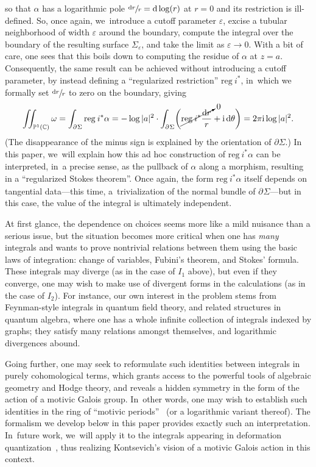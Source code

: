 \documentclass[10pt]{amsart}
\newcommand{\rbbrac}[1]{\biggl(#1\biggr)}
\newcommand{\dslog}[1]{\sfrac{\dd#1}{#1}}
\theoremstyle{definition}
\theoremstyle{remark}
\newcommand{\CC}{\mathbb{C}}
\newcommand{\PP}{\mathbb{P}}
\newcommand{\iu}{\mathrm{i}}
\let\epsilon\varepsilon
\newcommand{\dd}{\mathrm{d}}
\newcommand{\dlog}[1]{\frac{\dd#1}{#1}}
\newcommand{\reg}[1][]{\mathrm{reg}_{#1}}
\newcommand{\Sig}{\Sigma}
\newcommand{\bdSig}[1][]{\partial^{#1}\Sigma}
\begin{document}
so that $\alpha$ has a logarithmic pole $\dslog{r} = \dd\log(r)$ at $r=0$ and its restriction is ill-defined. So, once again, we~introduce a cutoff parameter $\epsilon$, excise a tubular neighborhood of width $\epsilon$ around the boundary, compute the integral over the boundary of the resulting surface $\Sig_\epsilon$, and take the limit as $\epsilon \to 0$. With a bit of care, one sees that this boils down to computing the residue of $\alpha$ at $z=a$. Consequently, the same result can be achieved without introducing a cutoff parameter, by instead defining a ``regularized restriction'' $\reg\, i^*$, in~which we formally set $\dslog{r}$ to zero on the boundary, giving\vspace*{-3pt}
\[
\iint_{\PP^1(\CC)} \omega = \int_{\bdSig} \reg\, i^*\alpha = -\log|a|^2 \cdot \int_{\bdSig} \rbbrac{\cancelto{0}{\reg\, i^* \dlog{r}} + \iu\, \dd\theta} = 2\pi\iu \log|a|^2.
\]
(The disappearance of the minus sign is explained by the orientation of $\partial\Sig$.) In this paper, we~will explain how this ad hoc construction of $\reg\, i^*\alpha$ can be interpreted, in~a precise sense, as the pullback of $\alpha$ along a morphism, resulting in a ``regularized Stokes theorem''. Once again, the form $\reg\, i^* \alpha$ itself depends on tangential data---this time, a~trivialization of the normal bundle of $\bdSig$---but in this case, the value of the integral is ultimately independent.

At first glance, the dependence on choices seems more like a mild nuisance than a serious issue, but the situation becomes more critical when one has \emph{many} integrals and wants to prove nontrivial relations between them using the basic laws of integration: change of variables, Fubini's theorem, and Stokes' formula. These integrals may diverge (as in the case of $I_1$ above), but even if they converge, one may wish to make use of divergent forms in the calculations (as in the case of $I_2$). For instance, our own interest in the problem stems from Feynman-style integrals in quantum field theory, and related structures in quantum algebra, where one has a whole infinite collection of integrals indexed by graphs; they satisfy many relations amongst themselves, and logarithmic divergences abound.

Going further, one may seek to reformulate such identities between integrals in purely cohomological terms, which grants access to the powerful tools of algebraic geometry and Hodge theory, and reveals a hidden symmetry in the form of the action of a motivic Galois group. In~other words, one may wish to establish such identities in the ring of ``motivic periods''~\cite{KontsevichZagier,BrownMotivicPeriods} (or a logarithmic variant thereof). The formalism we develop below in this paper provides exactly such an interpretation. In~future work, we~will apply it to the integrals appearing in deformation quantization~\cite{KontsevichOperadsMotives,Kontsevich2003,AlekseevRossiTorossianWillwacher:Logs}, thus realizing Kontsevich's vision of a motivic Galois action in this context.
\end{document}
